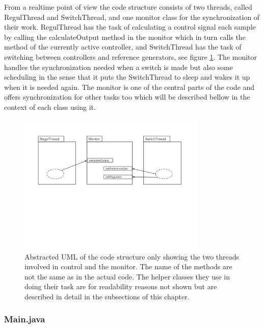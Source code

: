 
From a realtime point of view the code structure consists of two threads, called RegulThread and SwitchThread, and one monitor class for the synchronization of their work. RegulThread has the task of calculating a control signal each sample by calling the calculateOutput method in the monitor which in turn calls the method of the currently active controller, and SwitchThread has the task of switching between controllers and reference generators, see figure \ref{overall_fig}. The monitor handles the synchronization needed when a switch is made but also some scheduling in the sense that it puts the SwitchThread to sleep and wakes it up when it is needed again. The monitor is one of the central parts of the code and offers synchronization for other tasks too which will be described bellow in the context of each class using it. 
\begin{figure}
\centering
\includegraphics[width=0.8\textwidth]{figures/Overall.png}
\caption{Abstracted UML of the code structure only showing the two threads involved in control and the  monitor. The name of the methods are not the same as in the actual code. The helper classes they use in doing their
task are for readability reasons not shown but are described in detail in the subsections of this chapter.}
\label{overall_fig}
\end{figure}

\subsubsection{Main.java}

